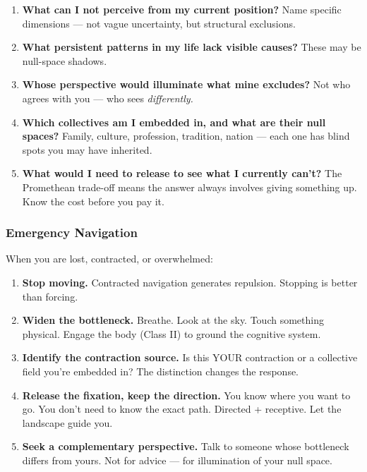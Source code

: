 \begin{enumerate}[nosep,leftmargin=*]
  \item \textbf{What can I not perceive from my current position?} Name specific dimensions — not vague uncertainty, but structural exclusions.
  \item \textbf{What persistent patterns in my life lack visible causes?} These may be null-space shadows.
  \item \textbf{Whose perspective would illuminate what mine excludes?} Not who agrees with you — who sees \textit{differently.}
  \item \textbf{Which collectives am I embedded in, and what are their null spaces?} Family, culture, profession, tradition, nation — each one has blind spots you may have inherited.
  \item \textbf{What would I need to release to see what I currently can't?} The Promethean trade-off means the answer always involves giving something up. Know the cost before you pay it.
\end{enumerate}


\subsubsection*{Emergency Navigation}


When you are lost, contracted, or overwhelmed:


\begin{enumerate}[nosep,leftmargin=*]
  \item \textbf{Stop moving.} Contracted navigation generates repulsion. Stopping is better than forcing.
  \item \textbf{Widen the bottleneck.} Breathe. Look at the sky. Touch something physical. Engage the body (Class II) to ground the cognitive system.
  \item \textbf{Identify the contraction source.} Is this YOUR contraction or a collective field you're embedded in? The distinction changes the response.
  \item \textbf{Release the fixation, keep the direction.} You know where you want to go. You don't need to know the exact path. Directed + receptive. Let the landscape guide you.
  \item \textbf{Seek a complementary perspective.} Talk to someone whose bottleneck differs from yours. Not for advice — for illumination of your null space.
\end{enumerate}


\bigskip\noindent\makebox[\textwidth]{\color{rulegray}\rule{5cm}{0.3pt}}\bigskip


